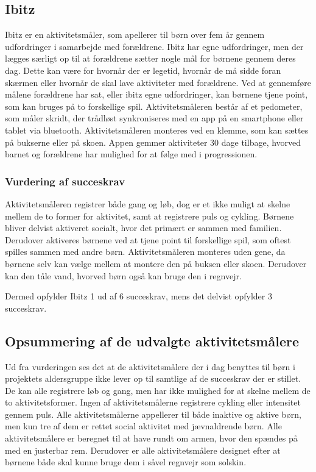 \subsection{Ibitz}
Ibitz er en aktivitetsmåler, som apellerer til børn over fem år gennem udfordringer i samarbejde med forældrene. Ibitz har egne udfordringer, men der lægges særligt op til at forældrene sætter nogle mål for børnene gennem deres dag. Dette kan være for hvornår der er legetid, hvornår de må sidde foran skærmen eller hvornår de skal lave aktiviteter med forældrene. Ved at gennemføre målene forældrene har sat, eller ibitz egne udfordringer, kan børnene tjene point, som kan bruges på to forskellige spil. Aktivitetsmåleren består af et pedometer, som måler skridt, der trådløst synkroniseres med en app på en smartphone eller tablet via bluetooth. Aktivitetsmåleren monteres ved en klemme, som kan sættes på bukserne eller på skoen. Appen gemmer aktiviteter 30 dage tilbage, hvorved barnet og forældrene har mulighed for at følge med i progressionen. \citep{Ibitz_features2016}

\subsubsection{Vurdering af succeskrav}
Aktivitetsmåleren registrer både gang og løb, dog er et ikke muligt at skelne mellem de to former for aktivitet, samt at registrere puls og cykling. Børnene bliver delvist aktiveret socialt, hvor det primært er sammen med familien. Derudover aktiveres børnene ved at tjene point til forskellige spil, som oftest spilles sammen med andre børn. Aktivitetsmåleren monteres uden gene, da børnene selv kan vælge mellem at montere den på buksen eller skoen. Derudover kan den tåle vand, hvorved børn også kan bruge den i regnvejr.  

Dermed opfylder Ibitz 1 ud af 6 succeskrav, mens det delvist opfylder 3 succeskrav.

\subsection{Opsummering af de udvalgte aktivitetsmålere}
Ud fra vurderingen ses det at de aktivitetsmålere der i dag benyttes til børn i projektets aldersgruppe ikke lever op til samtlige af de succeskrav der er stillet. De kan alle registrere løb og gang, men har ikke mulighed for at skelne mellem de to aktivitetsformer. Ingen af aktivitetsmålerne registrere cykling eller intensitet gennem puls. Alle aktivitetsmålerne appellerer til både inaktive og aktive børn, men kun tre af dem er rettet social aktivitet med jævnaldrende børn. Alle aktivitetsmålere er beregnet til at have rundt om armen, hvor den spændes på med en justerbar rem. Derudover er alle aktivitetsmålere designet efter at børnene både skal kunne bruge dem i såvel regnvejr som solskin.


